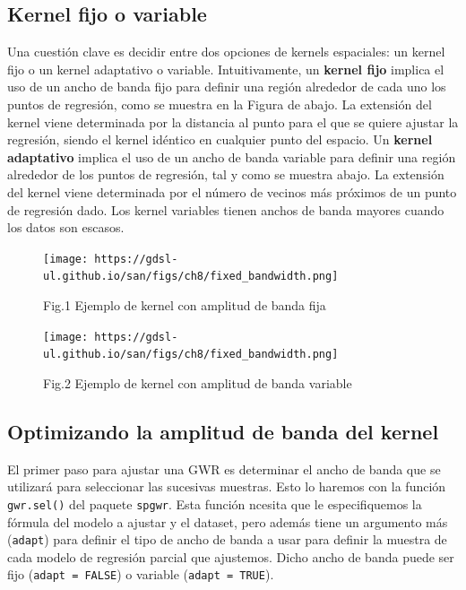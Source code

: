 \documentclass[
  letterpaper,
  DIV=11,
  numbers=noendperiod]{scrreprt}
\begin{document}
\hypertarget{kernel-fijo-o-variable}{%
\subsection{Kernel fijo o variable}\label{kernel-fijo-o-variable}}

Una cuestión clave es decidir entre dos opciones de kernels espaciales:
un kernel fijo o un kernel adaptativo o variable. Intuitivamente, un
\textbf{kernel fijo} implica el uso de un ancho de banda fijo para
definir una región alrededor de cada uno los puntos de regresión, como
se muestra en la Figura de abajo. La extensión del kernel viene
determinada por la distancia al punto para el que se quiere ajustar la
regresión, siendo el kernel idéntico en cualquier punto del espacio. Un
\textbf{kernel adaptativo} implica el uso de un ancho de banda variable
para definir una región alrededor de los puntos de regresión, tal y como
se muestra abajo. La extensión del kernel viene determinada por el
número de vecinos más próximos de un punto de regresión dado. Los kernel
variables tienen anchos de banda mayores cuando los datos son escasos.

\begin{figure}

{\centering \texttt{[image: https://gdsl-ul.github.io/san/figs/ch8/fixed\_bandwidth.png]}

}

\caption{Fig.1 Ejemplo de kernel con amplitud de banda fija}

\end{figure}

\begin{figure}

{\centering \texttt{[image: https://gdsl-ul.github.io/san/figs/ch8/fixed\_bandwidth.png]}

}

\caption{Fig.2 Ejemplo de kernel con amplitud de banda variable}

\end{figure}

\hypertarget{optimizando-la-amplitud-de-banda-del-kernel}{%
\subsection{Optimizando la amplitud de banda del
kernel}\label{optimizando-la-amplitud-de-banda-del-kernel}}

El primer paso para ajustar una GWR es determinar el ancho de banda que
se utilizará para seleccionar las sucesivas muestras. Esto lo haremos
con la función \texttt{gwr.sel()} del paquete \texttt{spgwr}. Esta
función ncesita que le especifiquemos la fórmula del modelo a ajustar y
el dataset, pero además tiene un argumento más (\texttt{adapt}) para
definir el tipo de ancho de banda a usar para definir la muestra de cada
modelo de regresión parcial que ajustemos. Dicho ancho de banda puede
ser fijo (\texttt{adapt\ =\ FALSE}) o variable
(\texttt{adapt\ =\ TRUE}).
\end{document}
